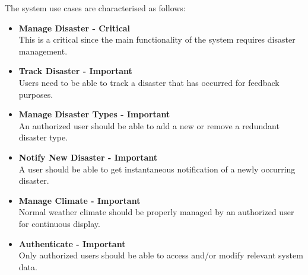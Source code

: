 The system use cases are characterised as follows:
 \begin{itemize}

 	\item \textbf{Manage Disaster - Critical}\\ This is a critical since the main functionality of the system requires disaster management.
 	\item \textbf{Track Disaster - Important}\\ Users need to be able to track a disaster that has occurred for feedback purposes. 
 	\item \textbf{Manage Disaster Types - Important}\\ An authorized user should be able to add a new or remove a redundant disaster type.
 	\item \textbf{Notify New Disaster - Important}\\ A user should be able to get instantaneous notification of a newly occurring disaster.
 	\item \textbf{Manage Climate - Important}\\ Normal weather climate should be properly managed by an authorized user for continuous display.
 	\item \textbf{Authenticate - Important}\\ Only authorized users should be able to access and/or modify relevant system data.  
 \end{itemize}